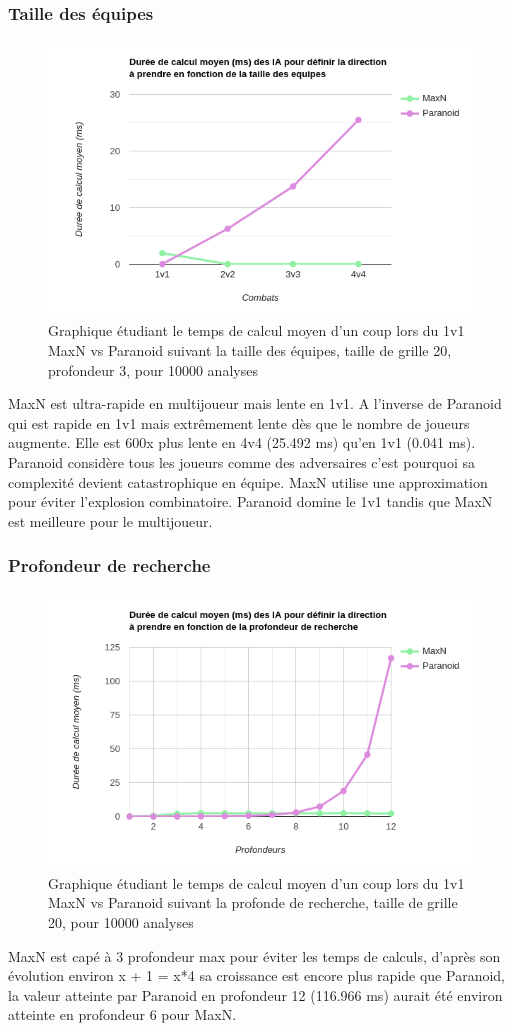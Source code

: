 \documentclass[a4paper,12pt]{article}
\begin{document}
\subsubsection{Taille des équipes}
\begin{figure}[h!]
		\centering	\includegraphics[width=0.5\linewidth]{TempsCoupEquipe}
		\caption{Graphique étudiant le temps de calcul moyen d'un coup lors du 1v1 MaxN vs Paranoid suivant la taille des équipes, taille de grille 20, profondeur 3, pour 10000 analyses}
		\end{figure}
MaxN est ultra-rapide en multijoueur mais lente en 1v1. A l'inverse de Paranoid qui est rapide en 1v1 mais extrêmement lente dès que le nombre de joueurs augmente. Elle est 600x plus lente en 4v4 (25.492 ms) qu'en 1v1 (0.041 ms).
Paranoid considère tous les joueurs comme des adversaires c'est pourquoi sa complexité devient catastrophique en équipe.
MaxN utilise une approximation pour éviter l'explosion combinatoire.
Paranoid domine le 1v1 tandis que MaxN est meilleure pour le multijoueur.

\subsubsection{Profondeur de recherche}
\begin{figure}[h!]
		\centering	\includegraphics[width=0.5\linewidth]{TempsCoupProfondeur}
		\caption{Graphique étudiant le temps de calcul moyen d'un coup lors du 1v1 MaxN vs Paranoid suivant la profonde de recherche, taille de grille 20, pour 10000 analyses}
		\end{figure}
MaxN est capé à 3 profondeur max pour éviter les temps de calculs, d'après son évolution environ x + 1 = x*4 sa croissance est encore plus rapide que Paranoid, la valeur atteinte par Paranoid en profondeur 12 (116.966 ms) aurait été environ atteinte en profondeur 6 pour MaxN. 
\end{document}
